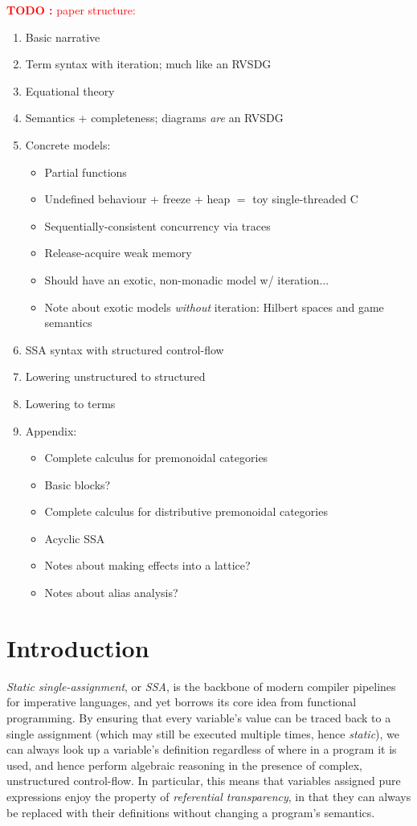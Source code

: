 \documentclass[acmsmall,screen,review]{acmart}
\newcounter{todos}
\newcommand{\TODO}[1]{{
  \stepcounter{todos}
  \begin{center}\large{\textcolor{red}{\textbf{TODO \arabic{todos}:} #1}}\end{center}
}}
\begin{document}
\TODO{paper structure:}
\begin{enumerate}
  \item Basic narrative
  \item Term syntax with iteration; much like an RVSDG \cite{rvsdg}
  \item Equational theory
  \item Semantics + completeness; diagrams \emph{are} an RVSDG
  \item Concrete models:
  \begin{itemize}
    \item Partial functions
    \item Undefined behaviour + freeze + heap $=$ toy single-threaded C
    \item Sequentially-consistent concurrency via traces
    \item Release-acquire weak memory
    \item Should have an exotic, non-monadic model w/ iteration...
    \item Note about exotic models \emph{without} iteration: Hilbert spaces and game semantics
  \end{itemize}
  \item SSA syntax with structured control-flow
  \item Lowering unstructured to structured
  \item Lowering to terms
  \item Appendix:
  \begin{itemize}
    \item Complete calculus for premonoidal categories
    \item Basic blocks?
    \item Complete calculus for distributive premonoidal categories
    \item Acyclic SSA
    \item Notes about making effects into a lattice?
    \item Notes about alias analysis?
  \end{itemize}
\end{enumerate}

\section{Introduction}

\emph{Static single-assignment}, or \emph{SSA}, is the backbone of modern compiler pipelines for
imperative languages, and yet borrows its core idea from functional programming. By ensuring that
every variable's value can be traced back to a single assignment (which may still be executed
multiple times, hence \emph{static}), we can always look up a variable's definition regardless of
where in a program it is used, and hence perform algebraic reasoning in the presence of complex,
unstructured control-flow. In particular, this means that variables assigned pure expressions enjoy
the property of \emph{referential transparency}, in that they can always be replaced with their
definitions without changing a program's semantics.
\end{document}
